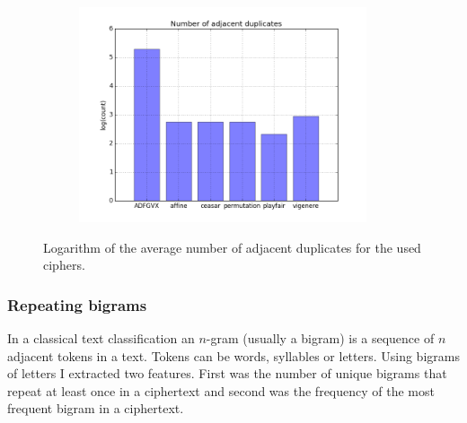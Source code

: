 \documentclass[a4paper]{article}
\begin{document}
\begin{figure}[H]
    \centering
    \begin{subfigure}[h]{0.5\textwidth}
        \centering
        \includegraphics[height=2.5in]{img/no_adj_dups_log.png}
    \end{subfigure}
    \caption{Logarithm of the average number of adjacent duplicates for the used ciphers.}
    \label{fig:adj_dups}
\end{figure}

\subsubsection*{Repeating bigrams}
In a classical text classification an $n$-gram (usually a bigram) is a sequence of $n$ adjacent tokens in a text. Tokens can be words, syllables or letters. Using bigrams of letters I extracted two features. First was the number of unique bigrams that repeat at least once in a ciphertext and second was the frequency of the most frequent bigram in a ciphertext.
\end{document}
